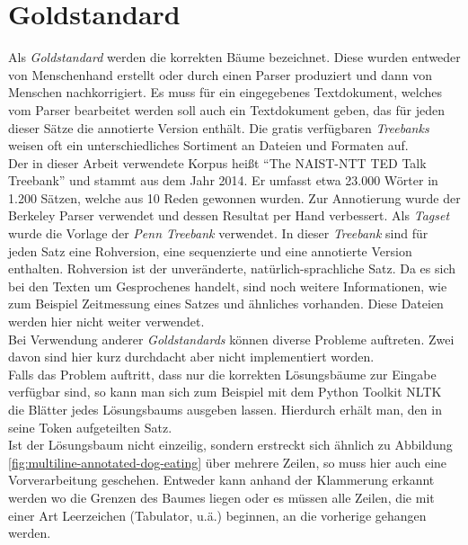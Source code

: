 \section{Goldstandard}
Als \textit{Goldstandard} werden die korrekten Bäume bezeichnet. Diese wurden entweder von Menschenhand erstellt oder durch einen Parser produziert und dann von Menschen nachkorrigiert. Es muss für ein eingegebenes Textdokument, welches vom Parser bearbeitet werden soll auch ein Textdokument geben, das für jeden dieser Sätze die annotierte Version enthält. Die gratis verfügbaren \textit{Treebanks} weisen oft ein unterschiedliches Sortiment an Dateien und Formaten auf.\\
Der in dieser Arbeit verwendete Korpus heißt ``The NAIST-NTT TED Talk Treebank'' \cite{tedtalks} und stammt aus dem Jahr 2014. Er umfasst etwa 23.000 Wörter in 1.200 Sätzen, welche aus 10 Reden gewonnen wurden. Zur Annotierung wurde der Berkeley Parser verwendet und dessen Resultat per Hand verbessert. Als \textit{Tagset} wurde die Vorlage der \textit{Penn Treebank} verwendet. 
In dieser \textit{Treebank} sind für jeden Satz eine Rohversion, eine sequenzierte und eine annotierte Version enthalten. Rohversion ist der unveränderte, natürlich-sprachliche Satz. Da es sich bei den Texten um Gesprochenes handelt, sind noch weitere Informationen, wie zum Beispiel Zeitmessung eines Satzes und ähnliches vorhanden. Diese Dateien werden hier nicht weiter verwendet.\\
Bei Verwendung anderer \textit{Goldstandards} können diverse Probleme auftreten. Zwei davon sind hier kurz durchdacht aber nicht implementiert worden.\\
Falls das Problem auftritt, dass nur die korrekten Lösungsbäume zur Eingabe verfügbar sind, so kann man sich zum Beispiel mit dem Python Toolkit NLTK \cite{nltk} %
die Blätter jedes Lösungsbaums ausgeben lassen. Hierdurch erhält man, den in seine Token aufgeteilten Satz.\\
Ist der Lösungsbaum nicht einzeilig, sondern erstreckt sich ähnlich zu Abbildung \ref{fig:multiline-annotated-dog-eating}  über mehrere Zeilen, so muss hier auch eine Vorverarbeitung geschehen. Entweder kann anhand der Klammerung erkannt werden wo die Grenzen des Baumes liegen oder es müssen alle Zeilen, die mit einer Art Leerzeichen (Tabulator, u.ä.) beginnen, an die vorherige gehangen werden.

